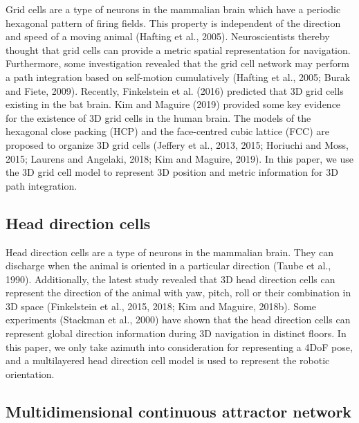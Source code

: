 Grid cells are a type of neurons in the mammalian brain which have a periodic hexagonal pattern of firing fields. 
This property is independent of the direction and speed of a moving animal (Hafting et al., 2005). 
Neuroscientists thereby thought that grid cells can provide a metric spatial representation for navigation. 
Furthermore, some investigation revealed that the grid cell network may perform a path integration based on self-motion cumulatively (Hafting et al., 2005; Burak and Fiete, 2009). 
Recently, Finkelstein et al. (2016) predicted that 3D grid cells existing in the bat brain. Kim and Maguire (2019) provided some key evidence for the existence of 3D grid cells in the human brain. 
The models of the hexagonal close packing (HCP) and the face-centred cubic lattice (FCC) are proposed to organize 3D grid cells (Jeffery et al., 2013, 2015; Horiuchi and Moss, 2015; Laurens and Angelaki, 2018; Kim and Maguire, 2019). 
In this paper, we use the 3D grid cell model to represent 3D position and metric information for 3D path integration.


\subsection{Head direction cells}

Head direction cells are a type of neurons in the mammalian brain. 
They can discharge when the animal is oriented in a particular direction (Taube et al., 1990). 
Additionally, the latest study revealed that 3D head direction cells can represent the direction of the animal with yaw, pitch, roll or their combination in 3D space (Finkelstein et al., 2015, 2018; Kim and Maguire, 2018b). 
Some experiments (Stackman et al., 2000) have shown that the head direction cells can represent global direction information during 3D navigation in distinct floors. 
In this paper, we only take azimuth into consideration for representing a 4DoF pose, and a multilayered head direction cell model is used to represent the robotic orientation.


\subsection{Multidimensional continuous attractor network}

